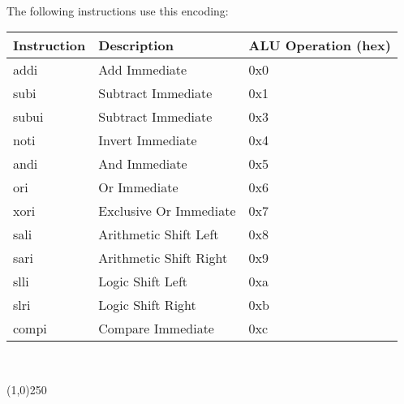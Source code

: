 \documentclass[letterpaper, 11pt]{article}
\begin{document}
\paragraph{}The following instructions use this encoding:
\begin{center}
	\begin{tabular}{|l|l|l|} \hline
			Instruction & Description 						& ALU Operation (hex) \\ \hline
			addi		& Add Immediate						& 0x0 \\ \hline
			subi 		& Subtract Immediate				& 0x1 \\ \hline
			subui		& Subtract Immediate 				& 0x3 \\ \hline
			noti		& Invert Immediate					& 0x4 \\ \hline
			andi		& And Immediate						& 0x5 \\ \hline
			ori			& Or Immediate						& 0x6 \\ \hline
			xori		& Exclusive Or Immediate			& 0x7 \\ \hline
			sali		& Arithmetic Shift Left				& 0x8 \\ \hline
			sari		& Arithmetic Shift Right			& 0x9 \\ \hline
			slli		& Logic Shift Left 					& 0xa \\ \hline
			slri		& Logic Shift Right					& 0xb \\ \hline
			compi		& Compare Immediate					& 0xc \\ \hline

	\end{tabular} \\
\end{center}
\begin{center}
	\line(1,0){250}
\end{center}

\newpage
\end{document}
